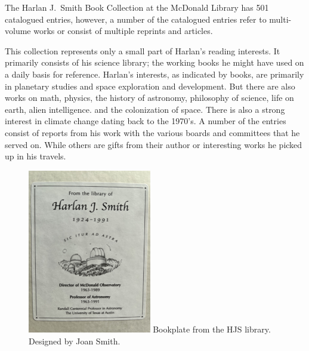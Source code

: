 

The Harlan J.~Smith Book Collection at the McDonald Library has 501
catalogued entries, however, a number of the catalogued entries refer
to multi-volume works or consist of multiple reprints and articles.

This collection represents only a small part of Harlan's reading
interests.  It primarily consists of his science library; the working
books he might have used on a daily basis for reference.  Harlan's
interests, as indicated by books, are primarily in planetary studies
and space exploration and development. But there are also works on
math, physics, the history of astronomy, philosophy of science, life
on earth, alien intelligence. and the colonization of space. There is
also a strong interest in climate change dating back to the 1970's.  A
number of the entries consist of reports from his work with the
various boards and committees that he served on. While others are
gifts from their author or interesting works he picked up in his
travels.

\begin{figure}
  \centering
  \includegraphics[width=0.48\textwidth]{hjs_bookplate_small.png}
  Bookplate from the HJS library. Designed by Joan Smith.
  \label{fig:bookplate}
\end{figure}

